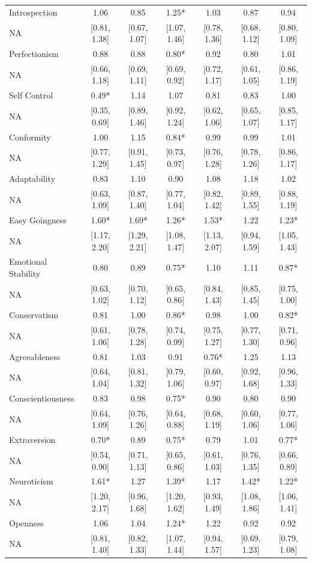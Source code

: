 \documentclass[man]{apa6}
\begin{document}
\begin{center}
\begin{ThreePartTable}
{\begin{longtable}{lcccccc}
Introspection & 1.06 & 0.85 & 1.25* & 1.03 & 0.87 & 0.94\\
NA & [0.81, 1.38] & [0.67, 1.07] & [1.07, 1.46] & [0.78, 1.36] & [0.68, 1.12] & [0.80, 1.09]\\
Perfectionism & 0.88 & 0.88 & 0.80* & 0.92 & 0.80 & 1.01\\
NA & [0.66, 1.18] & [0.69, 1.11] & [0.69, 0.92] & [0.72, 1.17] & [0.61, 1.05] & [0.86, 1.19]\\
Self Control & 0.49* & 1.14 & 1.07 & 0.81 & 0.83 & 1.00\\
NA & [0.35, 0.69] & [0.89, 1.46] & [0.92, 1.24] & [0.62, 1.06] & [0.65, 1.07] & [0.85, 1.17]\\
Conformity & 1.00 & 1.15 & 0.84* & 0.99 & 0.99 & 1.01\\
NA & [0.77, 1.29] & [0.91, 1.45] & [0.73, 0.97] & [0.76, 1.28] & [0.78, 1.26] & [0.86, 1.17]\\
Adaptability & 0.83 & 1.10 & 0.90 & 1.08 & 1.18 & 1.02\\
NA & [0.63, 1.09] & [0.87, 1.40] & [0.77, 1.04] & [0.82, 1.42] & [0.89, 1.55] & [0.88, 1.19]\\
Easy Goingness & 1.60* & 1.69* & 1.26* & 1.53* & 1.22 & 1.23*\\
NA & [1.17, 2.20] & [1.29, 2.21] & [1.08, 1.47] & [1.13, 2.07] & [0.94, 1.59] & [1.05, 1.43]\\
Emotional Stability & 0.80 & 0.89 & 0.75* & 1.10 & 1.11 & 0.87*\\
NA & [0.63, 1.02] & [0.70, 1.12] & [0.65, 0.86] & [0.84, 1.43] & [0.85, 1.45] & [0.75, 1.00]\\
Conservatism & 0.81 & 1.00 & 0.86* & 0.98 & 1.00 & 0.82*\\
NA & [0.61, 1.06] & [0.78, 1.28] & [0.74, 0.99] & [0.75, 1.27] & [0.77, 1.30] & [0.71, 0.96]\\
Agreeableness & 0.81 & 1.03 & 0.91 & 0.76* & 1.25 & 1.13\\
NA & [0.64, 1.04] & [0.81, 1.32] & [0.79, 1.06] & [0.60, 0.97] & [0.92, 1.68] & [0.96, 1.33]\\
Conscientiousness & 0.83 & 0.98 & 0.75* & 0.90 & 0.80 & 0.90\\
NA & [0.64, 1.09] & [0.76, 1.26] & [0.64, 0.88] & [0.68, 1.19] & [0.60, 1.06] & [0.77, 1.06]\\
Extraversion & 0.70* & 0.89 & 0.75* & 0.79 & 1.01 & 0.77*\\
NA & [0.54, 0.90] & [0.71, 1.13] & [0.65, 0.86] & [0.61, 1.03] & [0.76, 1.35] & [0.66, 0.89]\\
Neuroticism & 1.61* & 1.27 & 1.39* & 1.17 & 1.42* & 1.22*\\
NA & [1.20, 2.17] & [0.96, 1.68] & [1.20, 1.62] & [0.93, 1.49] & [1.08, 1.86] & [1.06, 1.41]\\
Openness & 1.06 & 1.04 & 1.24* & 1.22 & 0.92 & 0.92\\
NA & [0.81, 1.40] & [0.82, 1.33] & [1.07, 1.44] & [0.94, 1.57] & [0.69, 1.23] & [0.79, 1.08]\\
\bottomrule
\end{longtable}
}
\end{ThreePartTable}
\end{center}
\end{document}
